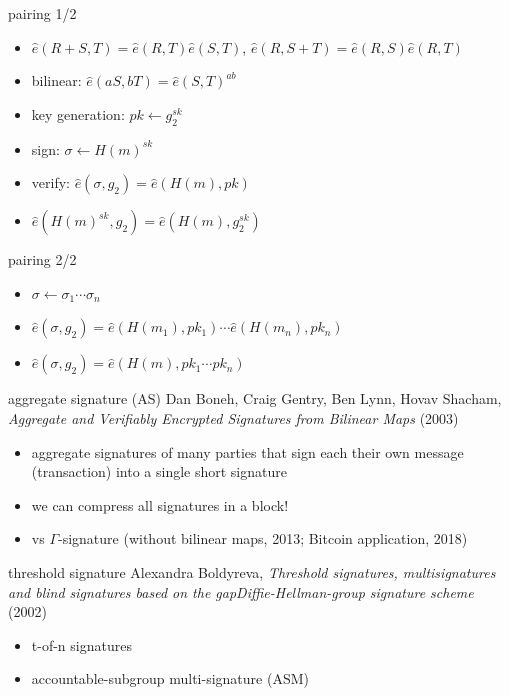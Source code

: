 \documentclass{beamer}
\begin{document}
\begin{frame}{pairing 1/2}
\begin{itemize}
\item $\hat{e}(R+S,T)=\hat{e}(R,T)\hat{e}(S,T)$, $\hat{e}(R,S+T)=\hat{e}(R,S)\hat{e}(R,T)$
\item bilinear: $\hat{e}(aS,bT)=\hat{e}(S,T)^{ab}$
\item key generation: $pk \leftarrow g_2^{sk}$
\item sign: $\sigma \leftarrow H(m)^{sk}$
\item verify: $\hat{e}(\sigma,g_2)=\hat{e}(H(m),pk)$
\item $\hat{e}(H(m)^{sk},g_2)=\hat{e}(H(m),g_2^{sk})$
\end{itemize}
\end{frame}

\begin{frame}{pairing 2/2}
\begin{itemize}
\item $\sigma \leftarrow \sigma_1\cdots\sigma_n$
\item $\hat{e}(\sigma,g_2)=\hat{e}(H(m_1),pk_1)\cdots\hat{e}(H(m_n),pk_n)$
\item $\hat{e}(\sigma,g_2)=\hat{e}(H(m),pk_1\cdots pk_n)$
\end{itemize}
\end{frame}

\begin{frame}{aggregate signature (AS)}
Dan Boneh, Craig Gentry, Ben Lynn, Hovav Shacham, \textit{Aggregate and Verifiably Encrypted Signatures from Bilinear Maps} (2003)
\begin{itemize}
\item aggregate signatures of many parties that sign each their own message (transaction) into a single short signature
\item we can compress all signatures in a block!
\item vs $\Gamma$-signature (without bilinear maps, 2013; Bitcoin application, 2018)
\end{itemize}
\end{frame}

\begin{frame}{threshold signature}
Alexandra Boldyreva, \textit{Threshold signatures, multisignatures and blind signatures based on the gapDiffie-Hellman-group signature scheme} (2002)
\begin{itemize}
\item t-of-n signatures
\item accountable-subgroup multi-signature (ASM)
\end{itemize}
\end{frame}
\end{document}
